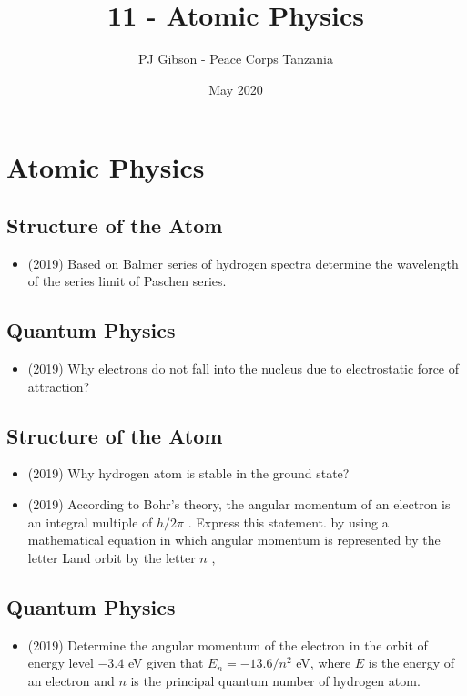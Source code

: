 \documentclass{article}
\title{11 - Atomic Physics}
\author{PJ Gibson - Peace Corps Tanzania}
\date{May 2020}
\begin{document}
\maketitle


\section{Atomic Physics}

\subsection{Structure of the Atom}
\begin{itemize}
\item (2019)  Based on Balmer series of hydrogen spectra determine the wavelength of the series limit of Paschen series. 
\end{itemize}

\subsection{Quantum Physics}
\begin{itemize}
\item (2019)  Why electrons do not fall into the nucleus due to electrostatic force of attraction?
\end{itemize}

\subsection{Structure of the Atom}
\begin{itemize}
\item (2019)  Why hydrogen atom is stable in the ground state? 
\item (2019)  According to Bohr’s theory, the angular momentum of an electron is an integral multiple of $ h/2\pi$ .  Express this statement. by using a mathematical equation in which angular momentum is represented by the letter Land orbit by the letter $ n$ , 
\end{itemize}

\subsection{Quantum Physics}
\begin{itemize}
\item (2019)  Determine the angular momentum of the electron in the orbit of energy level $ -3.4$ eV given that $ E_{n}=-13.6/n^{2}$ eV, where $ E$ is the energy of an electron and $ n$ is the principal quantum number of hydrogen atom. 
\end{itemize}
\end{document}
